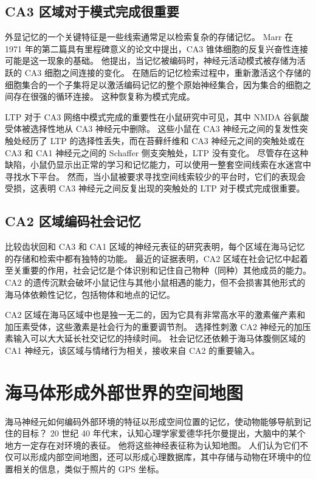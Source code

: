 \subsection{CA3 区域对于模式完成很重要}

外显记忆的一个关键特征是一些线索通常足以检索复杂的存储记忆。
Marr 在 1971 年的第二篇具有里程碑意义的论文中提出，CA3 锥体细胞的反复兴奋性连接可能是这一现象的基础。
他提出，当记忆被编码时，神经元活动模式被存储为活跃的 CA3 细胞之间连接的变化。
在随后的记忆检索过程中，重新激活这个存储的细胞集合的一个子集将足以激活编码记忆的整个原始神经集合，因为集合的细胞之间存在很强的循环连接。
这种恢复称为模式完成。


LTP 对于 CA3 网络中模式完成的重要性在小鼠研究中可见，其中 NMDA 谷氨酸受体被选择性地从 CA3 神经元中删除。
这些小鼠在 CA3 神经元之间的复发性突触处经历了 LTP 的选择性丢失，而在苔藓纤维和 CA3 神经元之间的突触处或在 CA3 和 CA1 神经元之间的 Schaffer 侧支突触处，LTP 没有变化。
尽管存在这种缺陷，小鼠仍显示出正常的学习和记忆能力，可以使用一整套空间线索在水迷宫中寻找水下平台。
然而，当小鼠被要求寻找空间线索较少的平台时，它们的表现会受损，这表明 CA3 神经元之间反复出现的突触处的 LTP 对于模式完成很重要。



\subsection{CA2 区域编码社会记忆}

比较齿状回和 CA3 和 CA1 区域的神经元表征的研究表明，每个区域在海马记忆的存储和检索中都有独特的功能。
最近的证据表明，CA2 区域在社会记忆中起着至关重要的作用，社会记忆是个体识别和记住自己物种（同种）其他成员的能力。
CA2 的遗传沉默会破坏小鼠记住与其他小鼠相遇的能力，但不会损害其他形式的海马体依赖性记忆，包括物体和地点的记忆。


CA2 区域在海马区域中也是独一无二的，因为它具有非常高水平的激素催产素和加压素受体，这些激素是社会行为的重要调节剂。
选择性刺激 CA2 神经元的加压素输入可以大大延长社交记忆的持续时间。
社会记忆还依赖于海马体腹侧区域的 CA1 神经元，该区域与情绪行为相关，接收来自 CA2 的重要输入。



\section{海马体形成外部世界的空间地图}

海马神经元如何编码外部环境的特征以形成空间位置的记忆，使动物能够导航到记住的目标？
20 世纪 40 年代末，认知心理学家爱德华托尔曼提出，大脑中的某个地方一定存在对环境的表征。
他将这些神经表征称为认知地图。
人们认为它们不仅可以形成内部空间地图，还可以形成心理数据库，其中存储与动物在环境中的位置相关的信息，类似于照片的 GPS 坐标。



